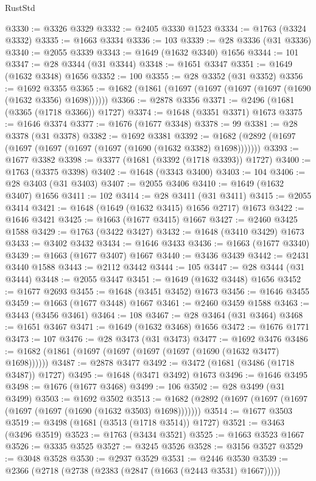 \begin{lexlean}{RustStd}
\begin{coremodule}
{\begin{coremodule}
{{{{{{{{{{{{{{{{{{{{{{{{{{{{{{{{{{{{{{{{{{{{@3330 := @3326 @3329
@3332 := @2405 @3330 @1523
@3334 := @1763 (@3324 @3332)
@3335 := @1663 @3334
@3336 := 103
@3339 := @28 @3336 (@31 @3336)
@3340 := @2055 @3339
@3343 := @1649 (@1632 @3340) @1656
@3344 := 101
@3347 := @28 @3344 (@31 @3344)
@3348 := @1651 @3347
@3351 := @1649 (@1632 @3348) @1656
@3352 := 100
@3355 := @28 @3352 (@31 @3352)
@3356 := @1692 @3355
@3365 := @1682 (@1861 (@1697 (@1697 (@1697 (@1697 (@1690 (@1632 @3356) @1698))))))
@3366 := @2878 @3356
@3371 := @2496 (@1681 (@3365 (@1718 @3366)) @1727)
@3374 := @1648 (@3351 @3371) @1673
@3375 := @1646 @3374
@3377 := @1676 (@1677 @3348)
@3378 := 99
@3381 := @28 @3378 (@31 @3378)
@3382 := @1692 @3381
@3392 := @1682 (@2892 (@1697 (@1697 (@1697 (@1697 (@1697 (@1690 (@1632 @3382) @1698)))))))
@3393 := @1677 @3382
@3398 := @3377 (@1681 (@3392 (@1718 @3393)) @1727)
@3400 := @1763 (@3375 @3398)
@3402 := @1648 (@3343 @3400)
@3403 := 104
@3406 := @28 @3403 (@31 @3403)
@3407 := @2055 @3406
@3410 := @1649 (@1632 @3407) @1656
@3411 := 102
@3414 := @28 @3411 (@31 @3411)
@3415 := @2055 @3414
@3421 := @1648 (@1649 (@1632 @3415) @1656 @2717) @1673
@3422 := @1646 @3421
@3425 := @1663 (@1677 @3415) @1667
@3427 := @2460 @3425 @1588
@3429 := @1763 (@3422 @3427)
@3432 := @1648 (@3410 @3429) @1673
@3433 := @3402 @3432
@3434 := @1646 @3433
@3436 := @1663 (@1677 @3340)
@3439 := @1663 (@1677 @3407) @1667
@3440 := @3436 @3439
@3442 := @2431 @3440 @1588
@3443 := @2112 @3442
@3444 := 105
@3447 := @28 @3444 (@31 @3444)
@3448 := @2055 @3447
@3451 := @1649 (@1632 @3448) @1656
@3452 := @1677 @2693
@3455 := @1648 (@3451 @3452) @1673
@3456 := @1646 @3455
@3459 := @1663 (@1677 @3448) @1667
@3461 := @2460 @3459 @1588
@3463 := @3443 (@3456 @3461)
@3464 := 108
@3467 := @28 @3464 (@31 @3464)
@3468 := @1651 @3467
@3471 := @1649 (@1632 @3468) @1656
@3472 := @1676 @1771
@3473 := 107
@3476 := @28 @3473 (@31 @3473)
@3477 := @1692 @3476
@3486 := @1682 (@1861 (@1697 (@1697 (@1697 (@1697 (@1690 (@1632 @3477) @1698))))))
@3487 := @2878 @3477
@3492 := @3472 (@1681 (@3486 (@1718 @3487)) @1727)
@3495 := @1648 (@3471 @3492) @1673
@3496 := @1646 @3495
@3498 := @1676 (@1677 @3468)
@3499 := 106
@3502 := @28 @3499 (@31 @3499)
@3503 := @1692 @3502
@3513 := @1682 (@2892 (@1697 (@1697 (@1697 (@1697 (@1697 (@1690 (@1632 @3503) @1698)))))))
@3514 := @1677 @3503
@3519 := @3498 (@1681 (@3513 (@1718 @3514)) @1727)
@3521 := @3463 (@3496 @3519)
@3523 := @1763 (@3434 @3521)
@3525 := @1663 @3523 @1667
@3526 := @3335 @3525
@3527 := @3245 @3526
@3528 := @3156 @3527
@3529 := @3048 @3528
@3530 := @2937 @3529
@3531 := @2446 @3530
@3539 := @2366 (@2718 (@2738 (@2383 (@2847 (@1663 (@2443 @3531) @1667)))))
}}}}}}}}}}}}}}}}}}}}}}}}}}}}}}}}}}}}}}}}}}}}
\end{coremodule}}
\end{coremodule}
\end{lexlean}
